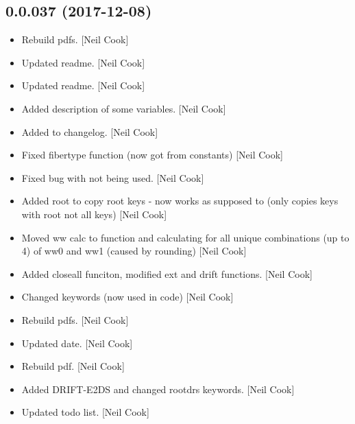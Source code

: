 \documentclass[a4paper,10pt,english]{report}
\begin{document}
\subsection{0.0.037 (2017-12-08)}
\label{\detokenize{misc/changelog:id514}}\begin{itemize}
\item {} 
Rebuild pdfs. {[}Neil Cook{]}

\item {} 
Updated readme. {[}Neil Cook{]}

\item {} 
Updated readme. {[}Neil Cook{]}

\item {} 
Added description of some variables. {[}Neil Cook{]}

\item {} 
Added to changelog. {[}Neil Cook{]}

\item {} 
Fixed fibertype function (now got from constants) {[}Neil Cook{]}

\item {} 
Fixed bug with  not being used. {[}Neil Cook{]}

\item {} 
Added root to copy root keys - now works as supposed to (only copies
keys with root not all keys) {[}Neil Cook{]}

\item {} 
Moved ww calc to function and calculating for all unique combinations
(up to 4) of ww0 and ww1 (caused by rounding) {[}Neil Cook{]}

\item {} 
Added closeall funciton, modified ext and drift functions. {[}Neil Cook{]}

\item {} 
Changed  keywords (now used in code) {[}Neil Cook{]}

\item {} 
Rebuild pdfs. {[}Neil Cook{]}

\item {} 
Updated date. {[}Neil Cook{]}

\item {} 
Rebuild pdf. {[}Neil Cook{]}

\item {} 
Added DRIFT-E2DS and changed rootdrs keywords. {[}Neil Cook{]}

\item {} 
Updated todo list. {[}Neil Cook{]}


\end{itemize}
\end{document}
